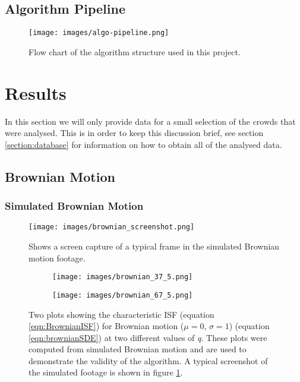 \documentclass[10pt]{article}
\begin{document}
\subsection{Algorithm Pipeline}
\begin{figure}[H]
\centering
\texttt{[image: images/algo-pipeline.png]}
\caption{Flow chart of the algorithm structure used in this project.}
\end{figure}

\section{Results}
\label{section:results}
In this section we will only provide data for a small selection of the crowds that were analysed. This is in order to keep this discussion brief, see section \ref{section:database} for information on how to obtain all of the analysed data.

\subsection{Brownian Motion}
\label{section:brownian}
\subsubsection{Simulated Brownian Motion}
\begin{figure}[H]
  \centering
  \texttt{[image: images/brownian\_screenshot.png]}
  \caption{Shows a screen capture of a typical frame in the simulated Brownian motion footage.}
  \label{fig:simulated_brownian_screenshot}
\end{figure}

\begin{figure}[H]
\begin{subfigure}[t]{.47\textwidth}
  \centering
  \texttt{[image: images/brownian\_37\_5.png]}
  \label{fig:simulated_brownian1_37_5}
\end{subfigure}%
\hfill
\begin{subfigure}[t]{.47\textwidth}
  \centering
  \texttt{[image: images/brownian\_67\_5.png]}
 \label{fig:simulated_brownian1_67_5}
\end{subfigure}
\caption{Two plots showing the characteristic ISF (equation \ref{eqn:BrownianISF}) for Brownian motion ($\mu = 0$, $\sigma = 1$) (equation \ref{eqn:brownianSDE}) at two different values of \textit{q}. These plots were computed from simulated Brownian motion and are used to demonstrate the validity of the algorithm. A typical screenshot of the simulated footage is shown in figure \ref{fig:simulated_brownian_screenshot}.}
\label{fig:simulated_brownian1}
\end{figure}
\end{document}
